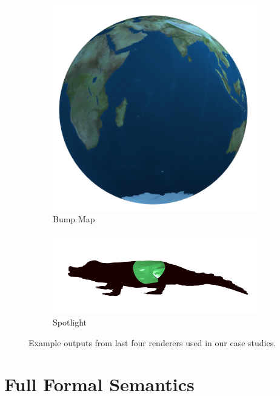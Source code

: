 \documentclass[acmsmall,review,anonymous]{acmart}
\begin{document}
\begin{figure}
\begin{subfigure}[b]{0.45\linewidth}
		\includegraphics[width=\linewidth]{fig/bump.png}
		\caption{Bump Map}
	\end{subfigure}
	\hfill
	\begin{subfigure}[b]{0.45\linewidth}
		\centering
		\includegraphics[width=\linewidth]{fig/spotlight.png}
		\caption{Spotlight}
	\end{subfigure}
	\caption{Example outputs from last four renderers used in our case studies.}
\end{figure}

\section{Full Formal Semantics}
\label{app:formalism}




\end{document}
